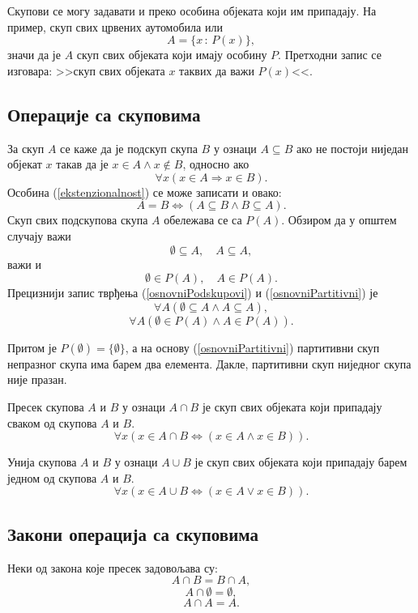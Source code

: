 \documentclass[a4paper]{book}
\begin{document}
Скупови се могу задавати и преко особина објеката који им припадају. На пример, скуп свих црвених
аутомобила или
$$
A=\{x\,:\,P(x)\},
$$
значи да је $A$ скуп свих објеката који имају особину $P$. Претходни запис се изговара:
>>скуп свих објеката $x$ таквих да важи $P(x)$<<.

\subsection{Операције са скуповима}

\indent

За скуп $A$ се каже да је подскуп скупа $B$ у ознаци $A\subseteq B$ ако не постоји
ниједан објекат $x$ такав да је $x\in A\land x\not\in B$, односно ако
$$
\forall x(x\in A\Rightarrow x\in B).
$$
Особина (\ref{ekstenzionalnost}) се може записати и овако:
$$
A=B\Leftrightarrow(A\subseteq B\land B\subseteq A).
$$
Скуп свих подскупова скупа $A$ обележава се са $P(A)$. Обзиром да у општем случају важи
\begin{equation}
\label{osnovniPodskupovi}
\emptyset\subseteq A,\quad A\subseteq A,
\end{equation}
важи и
\begin{equation}
\label{osnovniPartitivni}
\emptyset\in P(A),\quad A\in P(A).
\end{equation}
Прецизнији запис тврђења (\ref{osnovniPodskupovi}) и (\ref{osnovniPartitivni}) је
$$
\forall A(\emptyset\subseteq A\land A\subseteq A),
$$
$$
\forall A(\emptyset\in P(A)\land A\in P(A)).
$$

Притом је $P(\emptyset)=\{\emptyset\}$, а на основу (\ref{osnovniPartitivni}) партитивни
скуп непразног скупа има барем два елемента. Дакле, партитивни скуп ниједног скупа није празан.

Пресек скупова $A$ и $B$ у ознаци $A\cap B$ је скуп свих објеката који припадају сваком од скупова $A$ и $B$.
$$
\forall x(x\in A\cap B\Leftrightarrow(x\in A\land x\in B)).
$$

Унија скупова $A$ и $B$ у ознаци $A\cup B$ је скуп свих објеката који припадају барем једном од скупова $A$ и $B$.
$$
\forall x(x\in A\cup B\Leftrightarrow(x\in A\lor x\in B)).
$$

\subsection{Закони операција са скуповима}

\indent

Неки од закона које пресек задовољава су:
$$
A\cap B=B\cap A,
$$
$$
A\cap\emptyset=\emptyset,
$$
$$
A\cap A=A.
$$
\end{document}
